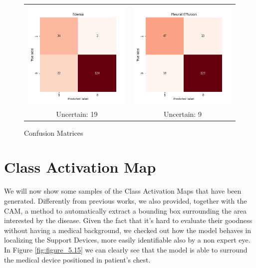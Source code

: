 \begin{figure}[h!]
\begin{tabular}{cc}
  \includegraphics[width=69mm]{Tesi/images/Results/Edema_cf.png} &   \includegraphics[width=69mm]{Tesi/images/Results/Pleural Effusion_cf.png} \\
\footnotesize{Uncertain: 19} & \footnotesize{Uncertain: 9} \\[6pt]
\end{tabular}
\caption{Confusion Matrices}
\label{fig:figure_5.14}
\end{figure}





\section{Class Activation Map}
\label{sec:cam_results}
We will now show some samples of the Class Activation Maps that have been generated. Differently from previous works, we also provided, together with the \ac{CAM}, a method to automatically extract a bounding box surrounding the area interested by the disease. Given the fact that it's hard to evaluate their goodness without having a medical background, we checked out how the model behaves in localizing the Support Devices, more easily identifiable also by a non expert eye. In Figure \ref{fig:figure_5.15} we can clearly see that the model is able to surround the medical device positioned in patient's chest.

